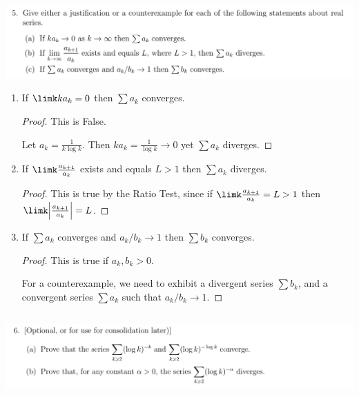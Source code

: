 \documentclass[12pt]{article}
\begin{document}
\begin{mdframed}
\includegraphics[width=400pt]{img/analysis--oxford-M2-I-6-5.png}
\end{mdframed}

\begin{enumerate}[label=(\alph*)]

\item
  \begin{claim*}
    If $\limk ka_k = 0$ then $\sum a_k$ converges.
  \end{claim*}
  \begin{proof}
    This is False.

    Let $a_k = \frac{1}{k\log k}$. Then $ka_k = \frac{1}{\log k} \to 0$ yet $\sum a_k$ diverges.
  \end{proof}

\item
  \begin{claim*}
    If $\limk \frac{a_{k+1}}{a_k}$ exists and equals $L > 1$ then $\sum a_k$ diverges.
  \end{claim*}
  \begin{proof}
    This is true by the Ratio Test, since if $\limk \frac{a_{k+1}}{a_k} = L > 1$ then\\
    $\limk \Big|\frac{a_{k+1}}{a_k}\Big| = L$.
  \end{proof}

\item
  \begin{claim*}
    If $\sum a_k$ converges and $a_k/b_k \to 1$ then $\sum b_k$ converges.
  \end{claim*}
  \begin{proof}
    This is true if $a_k, b_k > 0$.

    For a counterexample, we need to exhibit a divergent series $\sum b_k$, and a convergent series
    $\sum a_k$ such that $a_k/b_k \to 1$.

  \end{proof}
\end{enumerate}

\newpage
\subsection{}
\begin{mdframed}
\includegraphics[width=400pt]{img/analysis--oxford-M2-I-6-6.png}
\end{mdframed}
\end{document}
